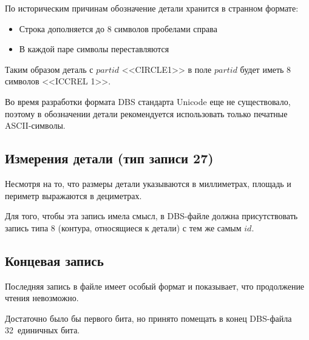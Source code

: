 
По историческим причинам обозначение детали хранится в странном формате:
\begin{itemize}
  \item
  Строка дополняется до 8 символов пробелами справа
  \item
  В каждой паре символы переставляются
\end{itemize}
Таким образом деталь с $partid$ <<CIRCLE1>>
в поле $partid$ будет иметь 8 символов
<<ICCREL 1>>.

Во время разработки формата DBS
стандарта Unicode еще не существовало,
поэтому в обозначении детали
рекомендуется использовать только
печатные ASCII-символы.

\subsection*{Измерения детали (тип записи 27)}


Несмотря на то, что размеры детали указываются в миллиметрах,
площадь и периметр выражаются в дециметрах.

Для того, чтобы эта запись имела смысл,
в DBS-файле должна присутствовать запись типа 8
(контура, относящиеся к детали)
с тем же самым $id$.

\subsection*{Концевая запись}
Последняя запись в файле имеет особый формат
и показывает,
что продолжение чтения невозможно.


Достаточно было бы первого бита,
но принято помещать в конец DBS-файла
32~единичных бита.
